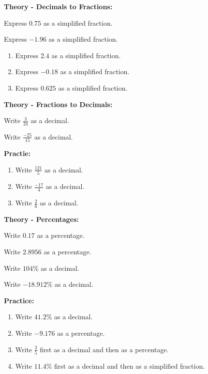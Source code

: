 \documentclass{article}
\begin{document}
{\bf Theory - Decimals to Fractions:}

Express $0.75$ as a simplified fraction.

\vfill

Express $-1.96$ as a simplified fraction.

\vfill
\clearpage

\begin{enumerate}
\item Express $2.4$ as a simplified fraction.
\item Express $-0.18$ as a simplified fraction.
\item Express $0.625$ as a simplified fraction.
\end{enumerate}

\clearpage

\textbf{Theory - Fractions to Decimals:}

Write $\frac{3}{24}$ as a decimal.

\vfil

Write $\frac{-25}{15}$ as a decimal.

\vfil

\clearpage

\textbf{Practie:}

\vspace{5mm}

\begin{enumerate}
\item Write $\frac{121}{5}$ as a decimal.
\item Write $\frac{-17}{4}$ as a decimal.
\item Write $\frac{2}{6}$ as a decimal.
\end{enumerate}


\clearpage


{\bf Theory - Percentages:}

Write $0.17$ as a percentage.

\vfil

Write $2.8956$ as a percentage.

\vfil

Write $104\%$ as a decimal.

\vfil

Write $-18.912\%$ as a decimal.

\clearpage


\textbf{Practice:}

\begin{enumerate}
\item Write $41.2\%$ as a decimal.
\item Write $-9.176$ as a percentage.
\item Write $\frac{2}{5}$ first as a decimal and then as a percentage.
\item Write $11.4\%$ first as a decimal and then as a simplified fraction.
\end{enumerate}
\end{document}
